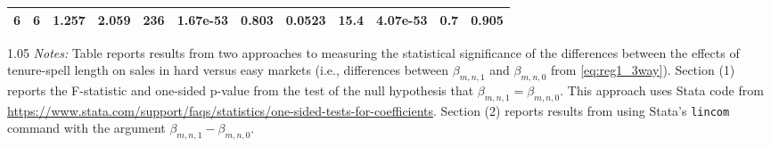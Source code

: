 \begin{table}[h!]
\begin{center}
\begin{tabular}{cccccccccccc}
6 & 6&1.257&2.059&236&1.67e-53&0.803&0.0523&15.4&4.07e-53&0.7&0.905\\
\bottomrule
\end{tabular}
\begin{fignote2}{1.05\textwidth}
\textit{Notes:} Table reports results from two approaches to measuring the statistical significance of the differences between the effects of tenure-spell length on sales in hard versus easy markets (i.e., differences between $\beta_{m,n,1}$ and $\beta_{m,n,0}$ from \eqref{eq:reg1_3way}). Section (1) reports the F-statistic and one-sided p-value from the test of the null hypothesis that $\beta_{m,n,1}=\beta_{m,n,0}$. This approach uses Stata code from \url{ https://www.stata.com/support/faqs/statistics/one-sided-tests-for-coefficients}. Section (2) reports results from using Stata's \texttt{lincom} command with the argument $\beta_{m,n,1} - \beta_{m,n,0}$.
\end{fignote2}
\end{center}
\normalsize
\end{table}
